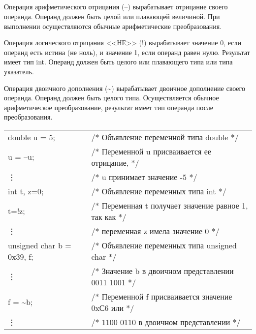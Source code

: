 \subsection{}

Операция арифметического отрицания ({--}) вырабатывает отрицание своего операнда. Операнд должен быть целой или плавающей величиной. При выполнении осуществляются обычные арифметические преобразования. \killoverfullbefore

Операция логического отрицания <<НЕ>> (!) вырабатывает значение 0, если операнд есть истина (не ноль), и значение 1, если операнд равен нулю. Результат имеет тип int. Операнд должен быть целого или плавающего типа или типа указатель. \killoverfullbefore

Операция двоичного дополнения (\textasciitilde) вырабатывает двоичное дополнение своего операнда. Операнд должен быть целого типа. Осуществляется обычное арифметическое преобразование, результат имеет тип операнда после преобразования. \killoverfullbefore \BL

\begin{pExample}
\begin{tabular}{ l l }
double u = 5; & \textcolor{exComm}{/* Объявление переменной типа double */} \\
u = {--}u;  & \textcolor{exComm}{/* Переменной u присваивается ее отрицание,  */} \\
\vdots & \textcolor{exComm}{/* u  принимает значение -5 */} \\
int t, z=0;  & \textcolor{exComm}{/* Объявление переменных типа int */} \\
t=!z;  & \textcolor{exComm}{/* Переменная t получает значение равное 1, так как */} \\
\vdots & \textcolor{exComm}{/* переменная z имела значение 0 */} \\
unsigned char  b = 0x39, f; & \textcolor{exComm}{/* Объявление переменных типа unsigned char */} \\
\vdots & \textcolor{exComm}{/* Значение b в двоичном представлении 0011 1001 */} \\
f = \textasciitilde b; & \textcolor{exComm}{/* Переменной f присваивается значение 0xС6 или  */} \\
\vdots & \textcolor{exComm}{/* 1100 0110 в двоичном представлении */} \\
\end{tabular}
\end{pExample}

